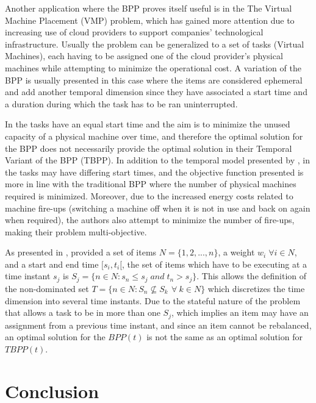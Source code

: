 Another application where the BPP proves itself useful is in the The Virtual
Machine Placement (VMP) problem, which has gained more attention due to
increasing use of cloud providers to support companies' technological
infrastructure. Usually the problem can be generalized to a set of tasks
(Virtual Machines), each having to be assigned one of the cloud provider's
physical machines while attempting to minimize the operational cost. A variation
of the BPP is usually presented in this case where the items are considered
ephemeral and add another temporal dimension since they have associated a start
time and a duration during which the task has to be ran uninterrupted. 

In \cite{de2016temporal} the tasks have an equal start time and the aim is to
minimize the unused capacity of a physical machine over time, and therefore the
optimal solution for the BPP does not necessarily provide the optimal solution
in their Temporal Variant of the BPP (TBPP). In addition to the temporal model
presented by \cite{de2016temporal}, in \cite{aydin2020multi} the tasks may have
differing start times, and the objective function presented is more in line with
the traditional BPP where the number of physical machines required is minimized.
Moreover, due to the increased energy costs related to machine fire-ups
(switching a machine off when it is not in use and back on again when required),
the authors also attempt to minimize the number of fire-ups, making their
problem multi-objective.

As presented in \cite{furini2018matheuristics}, provided a set of items $N =
\{1,2,...,n\}$, a weight $w_i \; \forall i \in N$, and a start and end time
$[s_i, t_i[$, the set of items which have to be executing at a time instant
$s_j$ is $S_j = \{n \in N: s_n \leq s_j \; and \; t_n > s_j\}$. This allows the
definition of the non-dominated set $T = \{n \in N: S_n \not\subseteq S_k\, \
\forall \ k \in N\}$ which discretizes the time dimension into several time
instants. Due to the stateful nature of the problem that allows a task to be in
more than one $S_j$, which implies an item may have an assignment from a
previous time instant, and since an item cannot be rebalanced, an optimal
solution for the $BPP(t)$ is not the same as an optimal solution for $TBPP(t)$.

\section{Conclusion}

